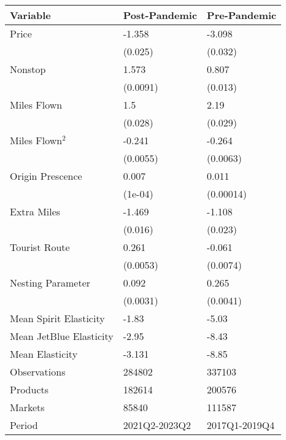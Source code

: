 
\begin{tabular}[t]{lll}
\toprule
Variable & Post-Pandemic & Pre-Pandemic\\
\midrule
Price & -1.358 & -3.098\\
 & (0.025) & (0.032)\\
Nonstop & 1.573 & 0.807\\
 & (0.0091) & (0.013)\\
Miles Flown & 1.5 & 2.19\\
\addlinespace
 & (0.028) & (0.029)\\
Miles Flown$^2$ & -0.241 & -0.264\\
 & (0.0055) & (0.0063)\\
Origin Prescence & 0.007 & 0.011\\
 & (1e-04) & (0.00014)\\
\addlinespace
Extra Miles & -1.469 & -1.108\\
 & (0.016) & (0.023)\\
Tourist Route & 0.261 & -0.061\\
 & (0.0053) & (0.0074)\\
Nesting Parameter & 0.092 & 0.265\\
\addlinespace
 & (0.0031) & (0.0041)\\
\midrule
Mean Spirit Elasticity & -1.83 & -5.03\\
Mean JetBlue Elasticity & -2.95 & -8.43\\
Mean Elasticity & -3.131 & -8.85\\
Observations & 284802 & 337103\\
\addlinespace
Products & 182614 & 200576\\
Markets & 85840 & 111587\\
Period & 2021Q2-2023Q2 & 2017Q1-2019Q4\\
\bottomrule
\end{tabular}
